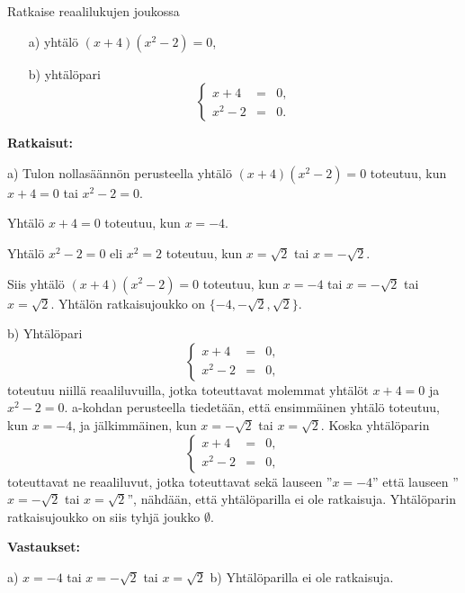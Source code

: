 \begin{esimerkki}
Ratkaise reaalilukujen joukossa
\begin{itemize}
\item[a)] yhtälö $(x + 4)(x^2 - 2) = 0$,
\item[b)] yhtälöpari
\[
\left\{
\begin{array}{rcl}
x + 4 & = & 0, \\
x^2 - 2 & = & 0.
\end{array}\right.
\]
\end{itemize}

{\bf Ratkaisut:}

a) Tulon nollasäännön perusteella yhtälö $(x + 4)(x^2 -
2) = 0$ toteutuu, kun $x + 4 = 0$ tai $x^2 - 2 = 0$.

Yhtälö $x + 4 = 0$ toteutuu, kun $x = -4$.

Yhtälö $x^2 - 2 = 0$ eli $x^2 = 2$ toteutuu, kun $x =
\sqrt{2}$ tai $x = -\sqrt{2}$.

Siis yhtälö $(x + 4)(x^2 - 2) = 0$ toteutuu, kun $x =
-4$ tai $x = -\sqrt{2}$ tai $x = \sqrt{2}$. Yhtälön
ratkaisujoukko on $\{-4, -\sqrt{2}, \sqrt{2} \}$.

b) Yhtälöpari
\[
\left\{
\begin{array}{rcl}
x + 4 & = & 0, \\
x^2 - 2 & = & 0,
\end{array}\right.
\]
toteutuu niillä reaaliluvuilla, jotka toteuttavat
molemmat yhtälöt $x + 4 = 0$ ja $x^2 - 2 = 0$. a-kohdan
perusteella tiedetään, että ensimmäinen yhtälö toteutuu,
kun $x = -4$, ja jälkimmäinen, kun $x = -\sqrt{2}$ tai $x
= \sqrt{2}$. Koska yhtälöparin
\[
\left\{
\begin{array}{rcl}
x + 4 & = & 0, \\
x^2 - 2 & = & 0,
\end{array}\right.
\]
toteuttavat ne reaaliluvut, jotka toteuttavat sekä
lauseen ''$x = -4$'' että lauseen ''$x = -\sqrt{2}$ tai
$x = \sqrt{2}$'', nähdään, että yhtälöparilla ei ole
ratkaisuja. Yhtälöparin ratkaisujoukko on siis tyhjä
joukko $\emptyset$.

{\bf Vastaukset:}

a) $x = -4$ tai $x = -\sqrt{2}$ tai $x = \sqrt{2}$
b) Yhtälöparilla ei ole ratkaisuja.
\end{esimerkki}


